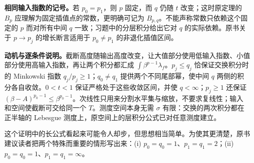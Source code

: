 \documentclass[../../main.tex]{subfiles}
\begin{document}
\begin{remark}
\textbf{相同输入指数的记号。}若 $p_0=p_1$，则 $p$ 固定，而 $q$ 仍随 $t$ 改变；这时原定理的 $B_p$ 应理解为固定插值点的常数，更明确可记为 $B_{p,q}$。不能声称常数只依赖这个固定的 $p$ 而对所有中间 $q$ 一致；习题中的分层积分给出它对 $q$ 的实际依赖。原书关于 $p\to p_j$ 的增长断言适用于 $p_0\ne p_1$ 的非退化插值区间。

\textbf{动机与逐条件说明。}截断高度随输出高度改变，让大值部分使用低输入指数、小值部分使用高输入指数，再让两个积分都汇成 $\int\beta^{p-1}\lambda_f$。$p_j\leqslant q_j$ 恰保证交换积分时的 Minkowski 指数 $q_j/p_j\geqslant1$；$q_0\ne q_1$ 提供两个不同尾部幂，使中间 $q$ 两侧的积分各自收敛。$0<t<1$ 保证严格处于这些收敛区间，并使 $q<\infty$；$p_j\geqslant1$ 还保证 $(\beta-A)^{p_0-1}\leqslant\beta^{p_0-1}$。次线性只用来分割水平集与缩放，不要求复线性；输入和空间使截断可交给同一个 $T$。测度空间本身无需 $\sigma$ 有限：交换的两次积分都在正半轴的 Lebesgue 测度上，原空间上的层积分公式已对任意测度建立。
\end{remark}
这个证明中的长公式看起来可能令人却步，但思想相当简单。为使其更清楚，原书建议读者把两个特殊而重要的情形写出来：(i) $p_0=q_0=1$、$p_1=q_1=2$；(ii) $p_0=q_0=1$、$p_1=q_1=\infty$。
\end{document}
